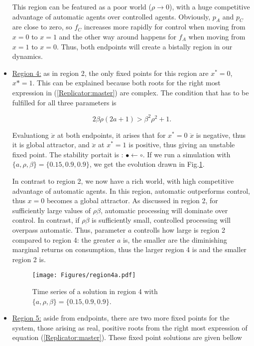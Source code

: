 \documentclass[10pt,a4paper]{article}
\begin{document}
\begin{itemize}
{ This region can be featured as a poor world ($\rho\rightarrow 0$), with a huge competitive advantage of automatic agents over controlled agents. Obviously, $p_A$
 and $p_C$ are close to zero, so $f_C$ increases more rapidly for control when moving from $x=0$ to $x=1$ and the other way around happens for $f_A$ when moving 
 from $x=1$ to $x=0$. Thus, both endpoints will create a bistally region in our dynamics. 
 }
 
 \item {\underline{Region 4:} as in region 2, the only fixed points for this region are $x^*=0$, $x*=1$. This can be explained because both roots for the right 
 most expression in (\ref{Replicator:master}) are complex. The condition that has to be fulfilled for all three parameters is
 
 $$2\beta\rho(2a+1) > \beta^2\rho^2 +1.$$
 
 Evaluationg $\ddot{x}$ at both endpoints, it arises that for $x^*=0$ $\ddot{x}$ is negative, thus it is global attractor, and $\ddot{x}$ at $x^*=1$ is positive,
 thus giving an unstable fixed point. The stability portait is : $\bullet\leftarrow\circ$. If we run a simulation with $\{a,\rho,\beta\}=\{0.15,0.9,0.9\}$, we
 get the evolution drawn in Fig.\ref{fig:region4}.
 
 In contrast to region 2, we now have a rich world, with high competitive advantage of automatic agents. In this region, automatic outperforms control,
 thus $x=0$ becomes a global attractor. As discussed in region 2, for sufficiently large values of $\rho\beta$, automatic processing will dominate over control. In
 contrast, if $\rho\beta$ is sufficiently small, controlled processing will overpass automatic. Thus, parameter $a$ controlls how large is region 2 compared to 
 region 4: the greater $a$ is, the smaller are the diminishing marginal returns on consumption, thus the larger region 4 is and the smaller region 2 is.

 \begin{figure}[h!]
\centering
\vspace{-1.5cm}
\texttt{[image: Figures/region4a.pdf]}
\vspace{-0.4cm}
\caption{Time series of a solution in region 4 with  $\{a,\rho,\beta\}=\{0.15,0.9,0.9\}$.}
\label{fig:region4}
\end{figure}
 
 
 }
 
 \item {\underline{Region 5:} aside from endpoints, there are two more fixed points for the system, those arising as real, positive roots from the right most 
 expression of equation (\ref{Replicator:master}). These fixed point solutions are given bellow
 
}
\end{itemize}
\end{document}

